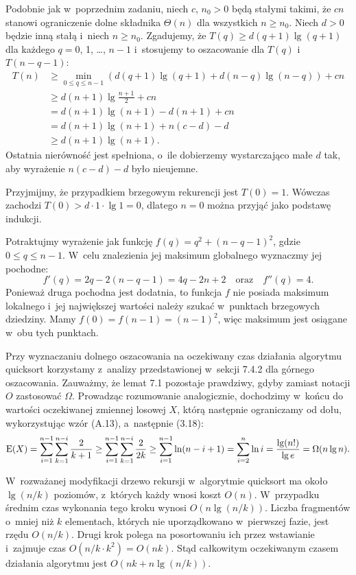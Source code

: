 Podobnie jak w~poprzednim zadaniu, niech $c$, $n_0>0$ będą stałymi takimi, że $cn$ stanowi ograniczenie dolne składnika $\Theta(n)$ dla wszystkich $n\ge n_0$.
Niech $d>0$ będzie inną stałą i~niech $n\ge n_0$.
Zgadujemy, że $T(q)\ge d(q+1)\lg(q+1)$ dla każdego $q=0$, 1, \dots, $n-1$ i~stosujemy to oszacowanie dla $T(q)$ i~$T(n-q-1)$:
\begin{align*}
    T(n) &\ge \min_{0\le q\le n-1}(d(q+1)\lg(q+1)+d(n-q)\lg(n-q))+cn \\
    &\ge d(n+1)\lg\frac{n+1}{2}+cn \\
	&= d(n+1)\lg(n+1)-d(n+1)+cn \\
	&= d(n+1)\lg(n+1)+n(c-d)-d \\
	&\ge d(n+1)\lg(n+1).
\end{align*}
Ostatnia nierówność jest spełniona, o~ile dobierzemy wystarczająco małe $d$ tak, aby wyrażenie $n(c-d)-d$ było nieujemne.

Przyjmijmy, że przypadkiem brzegowym rekurencji jest $T(0)=1$.
Wówczas zachodzi $T(0)>d\cdot1\cdot\lg1=0$, dlatego $n=0$ można przyjąć jako podstawę indukcji.

\exercise %
Potraktujmy wyrażenie jak funkcję $f(q)=q^2+(n-q-1)^2$, gdzie $0\le q\le n-1$.
W~celu znalezienia jej maksimum globalnego wyznaczmy jej pochodne:
\[
    f'(q) = 2q-2(n-q-1) = 4q-2n+2 \quad\text{oraz}\quad f''(q) = 4.
\]
Ponieważ druga pochodna jest dodatnia, to funkcja $f$ nie posiada maksimum lokalnego i~jej największej wartości należy szukać w~punktach brzegowych dziedziny.
Mamy $f(0)=f(n-1)=(n-1)^2$, więc maksimum jest osiągane w~obu tych punktach.

\exercise %
Przy wyznaczaniu dolnego oszacowania na oczekiwany czas działania algorytmu quicksort korzystamy z~analizy przedstawionej w~sekcji 7.4.2 dla górnego oszacowania.
Zauważmy, że lemat 7.1 pozostaje prawdziwy, gdyby zamiast notacji $O$ zastosować $\Omega$.
Prowadząc rozumowanie analogicznie, dochodzimy w~końcu do wartości oczekiwanej zmiennej losowej $X$, którą następnie ograniczamy od dołu, wykorzystując wzór (A.13), a~następnie (3.18):
\[
	\operatorname{E}(X) = \sum_{i=1}^{n-1}\sum_{k=1}^{n-i}\frac{2}{k+1} \ge \sum_{i=1}^{n-1}\sum_{k=1}^{n-i}\frac{2}{2k} \ge \sum_{i=1}^{n-1}\ln(n-i+1) = \sum_{i=2}^n\ln i = \frac{\lg(n!)}{\lg e} = \Omega(n\lg n).
\]

\exercise %
W~rozważanej modyfikacji drzewo rekursji w~algorytmie quicksort ma około $\lg(n/k)$ poziomów, z~których każdy wnosi koszt $O(n)$.
W~przypadku średnim czas wykonania tego kroku wynosi $O(n\lg(n/k))$.
Liczba fragmentów o~mniej niż $k$ elementach, których nie uporządkowano w~pierwszej fazie, jest rzędu $O(n/k)$.
Drugi krok polega na posortowaniu ich przez wstawianie i~zajmuje czas $O(n/k\cdot k^2)=O(nk)$.
Stąd całkowitym oczekiwanym czasem działania algorytmu jest $O(nk+n\lg(n/k))$.

